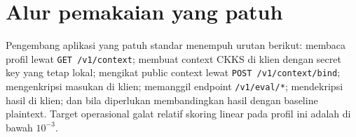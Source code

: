 \documentclass[12pt,a4paper,oneside]{report}
\begin{document}
\section*{Alur pemakaian yang patuh}

Pengembang aplikasi yang patuh standar menempuh urutan berikut: membaca profil lewat \texttt{GET /v1/context}; membuat context CKKS di klien dengan secret key yang tetap lokal; mengikat public context lewat \texttt{POST /v1/context/bind}; mengenkripsi masukan di klien; memanggil endpoint \texttt{/v1/eval/*}; mendekripsi hasil di klien; dan bila diperlukan membandingkan hasil dengan baseline plaintext. Target operasional galat relatif skoring linear pada profil ini adalah di bawah $10^{-3}$.
\end{document}
